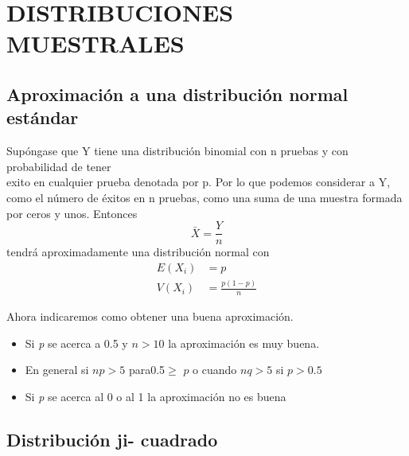 


\clearpage

\section{DISTRIBUCIONES MUESTRALES}

\subsection{Aproximaci\'{o}n a una distribuci\'{o}n normal est\'{a}ndar}%

\begin{theorem}
Sup\'{o}ngase que Y tiene una distribuci\'{o}n binomial con
n pruebas y con probabilidad de tener \\[\']{e}xito en cualquier prueba
denotada por p. Por lo que podemos con\-siderar a Y, como el n\'{u}mero de
\'{e}xitos en n pruebas, como una suma de una muestra formada por ceros y
unos. Entonces \[ \bar{X}=\frac{Y}{n}
\] tendr\'{a} aproximadamente una distribuci\'{o}n normal con
\begin{align*}
E\left(   X_i\right)    &  =p\\ V\left(   X_i\right)    &  =\frac{p\left(
1-p\right)   }{n}
\end{align*}
\end{theorem} 

Ahora indicaremos como obtener una buena aproximaci\'{o}n.

\begin{itemize}
\item Si \textit{p} se acerca a 0.5 y $n>10$ la aproximaci\'{o}n es muy buena.\newline 

\item En general si $n\mathit{p}>5$ para0.5$\geq$ $\mathit{p}$ o cuando
$n\mathit{q}>5$ si $\mathit{p}>0.5$\newline 

\item Si \textit{p } se acerca al 0 o al 1 la aproximaci\'{o}n no es buena
\end{itemize}

\subsection{Distribuci\'{o}n ji- cuadrado}%

